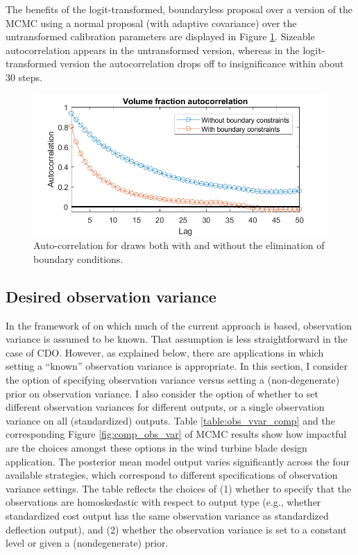 \documentclass{article}
\begin{document}
The benefits of the logit-transformed, boundaryless proposal over a version of the MCMC using a normal proposal (with adaptive covariance) over the untransformed calibration parameters are displayed in Figure \ref{ACFs}. Sizeable autocorrelation appears in the untransformed version, whereas in the logit-transformed version the autocorrelation drops off to insignificance within about 30 steps.

\begin{figure}
\centering
\includegraphics[width=.65\linewidth]{ACF_bnd_cnds_fig}
\captionsetup{width=.65\linewidth}
\caption{Auto-correlation for draws both with and without the elimination of boundary conditions.}
\label{ACFs}
\end{figure}

\subsection{Desired observation variance}\label{des_obs_var}

In the framework of \cite{Kennedy2006} on which much of the current approach is based, observation variance is assumed to be known. That assumption is less straightforward in the case of CDO. However, as explained below, there are applications in which setting a ``known'' observation variance is appropriate. In this section, I consider the option of specifying observation variance versus setting a (non-degenerate) prior on observation variance. I also consider the option of whether to set different observation variances for different outputs, or a single observation variance on all (standardized) outputs. Table \ref{table:obs_vvar_comp} and the corresponding Figure \ref{fig:comp_obs_var} of MCMC results show how impactful are the choices amongst these options in the wind turbine blade design application. The posterior mean model output varies significantly across the four available strategies, which correspond to different specifications of observation variance settings. The table reflects the choices of (1) whether to specify that the observations are homoskedastic with respect to output type (e.g., whether standardized cost output has the same observation variance as standardized deflection output), and (2) whether the observation variance is set to a constant level or given a (nondegenerate) prior.
\end{document}
